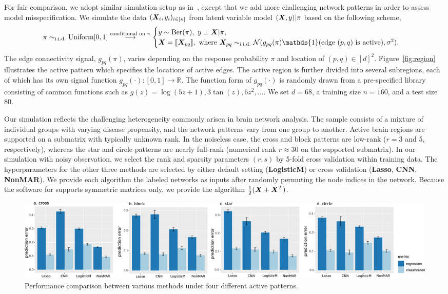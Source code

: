 \documentclass[11pt]{article}
\theoremstyle{plain}
\theoremstyle{definition}
\def\LogisticM{\text{\bf \small LogisticM }}
\begin{document}
For fair comparison, we adopt similar simulation setup as in~\cite{relion2019network}, except that we add more challenging network patterns in order to assess model misspecification. We simulate the data $(\bm X_i, y_i)_{i\in[n]}$ from latent variable model $(\bm X,y)|\pi$ based on the following scheme,
\[
\pi \sim_{\text{i.i.d.}} \text{Uniform}[0,1] \stackrel{\text{conditional on $\pi$}}{\longrightarrow}
\begin{cases}
y\sim \text{Ber}(\pi),\ \text{}y\perp \mX|\pi, \\
\mX=\entry{\mX_{pq}}, \ \text{where\ } \mX_{pq}\sim_{\text{i.i.d.}} \tN(g_{pq}(\pi)\mathds{1}(\text{edge $(p,q)$ is active}), \sigma^2).
\end{cases}
\]
The edge connectivity signal, $g_{pq}(\pi)$, varies depending on the response probability $\pi$ and location of $(p,q)\in[d]^2$. Figure~\ref{fig:region} illustrates the active pattern which specifies the locations of active edges. The active region is further divided into several subregions, each of which has its own signal function $g_{pq}(\cdot)\colon [0,1]\to \mathbb{R}$. The function form of $g_{pq}(\cdot)$ is randomly drawn from a pre-specified library consisting of common functions such as $g(z)=\log(5z+1), 3\tan(z),6z^2,\ldots$. We set $d=68$, a training size $n=160$, and a test size $80$. 

Our simulation reflects the challenging heterogeneity commonly arisen in brain network analysis. The sample consists of a mixture of individual groups with varying disease propensity, and the network patterns vary from one group to another. Active brain regions are supported on a submatrix with typically unknown rank. In the noiseless case, the cross and block patterns are low-rank ($r = 3$ and 5, respectively), whereas the star and circle patterns are nearly full-rank (numerical rank $r\approx 30$ on the supported submatrix). In our simulation with noisy observation, we select the rank and sparsity parameters $(r,s)$ by 5-fold cross validation within training data. The hyperparameters for the other three methods are selected by either default setting ({\bf \small LogisticM}) or cross validation ({\bf \small Lasso}, {\small \bf CNN}, {\small \bf NonMAR}). We provide each algorithm the labeled networks as inputs after randomly permuting the node indices in the network. Because the software for \LogisticM supports symmetric matrices only, we provide the algorithm ${1\over 2}(\bm X+\bm X^T)$. 

\begin{figure}[ht]
    \centering
    \includegraphics[width=\textwidth]{error_tot_comb2.pdf}
    \caption{Performance comparison between various methods under four different active patterns. }\label{fig:compare}
\end{figure}
\end{document}
